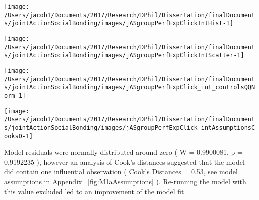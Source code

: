 \documentclass[english]{article}\usepackage[]{graphicx}\usepackage[]{color}
\makeatletter
\def\maxwidth{ %
  \ifdim\Gin@nat@width>\linewidth
    \linewidth
  \else
    \Gin@nat@width
  \fi
}
\newenvironment{knitrout}{}{} %
\newcommand{\pvalue}{p =}
\newcommand{\resdist}{W = }
\newcommand{\cooksD}{Cook's Distances}
\makeatother
\begin{document}
\begin{knitrout}
\color{fgcolor}

{\centering \texttt{[image: /Users/jacob1/Documents/2017/Research/DPhil/Dissertation/finalDocuments/jointActionSocialBonding/images/jASgroupPerfExpClickIntHist-1]} 

}



\end{knitrout}
\begin{knitrout}
\color{fgcolor}

{\centering \texttt{[image: /Users/jacob1/Documents/2017/Research/DPhil/Dissertation/finalDocuments/jointActionSocialBonding/images/jASgroupPerfExpClickIntScatter-1]} 

}



\end{knitrout}
\begin{knitrout}
\color{fgcolor}

{\centering \texttt{[image: /Users/jacob1/Documents/2017/Research/DPhil/Dissertation/finalDocuments/jointActionSocialBonding/images/jASgroupPerfExpClick\_int\_controlsQQNorm-1]} 

}



\end{knitrout}
\begin{knitrout}
\color{fgcolor}

{\centering \texttt{[image: /Users/jacob1/Documents/2017/Research/DPhil/Dissertation/finalDocuments/jointActionSocialBonding/images/jASgroupPerfExpClick\_intAssumptionsCooksD-1]} 

}



\end{knitrout}




Model residuals were normally distributed around zero
(
  \resdist
    0.9900081,
  \pvalue
    0.9192235
),
however
an analysis of Cook's distances suggested that the model did contain one influential observation
(
  \cooksD
  =
   0.53,
   see model assumptions in Appendix  ~\ref{fig:M1aAssumptions}
).
Re-running the model with this value excluded led to an improvement of the model fit.
\end{document}
